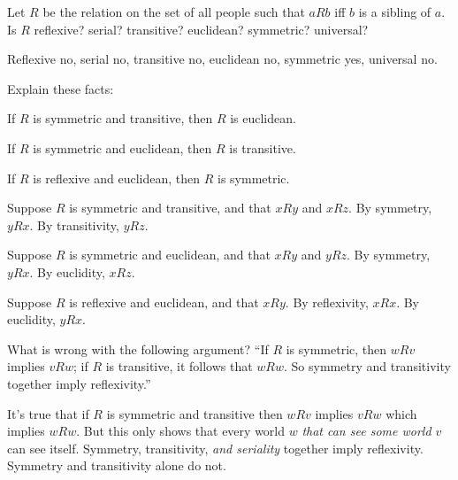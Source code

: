 \begin{exercise}
  Let $R$ be the relation on the set of all people such that $aRb$ iff $b$ is a
  sibling of $a$. Is $R$ reflexive? serial? transitive? euclidean? symmetric?
  universal?
\end{exercise}
\begin{solution}
  Reflexive no, serial no, transitive no, euclidean no, symmetric yes,
  universal no.
\end{solution}

\begin{exercise}\label{ex:relations}
  Explain these facts:
  \begin{exlist}
  \item If $R$ is symmetric and transitive, then $R$ is euclidean.
  \item If $R$ is symmetric and euclidean, then $R$ is transitive.
  \item If $R$ is reflexive and euclidean, then $R$ is symmetric.
  \end{exlist}
\end{exercise}
\begin{solution}
  \begin{sollist}
    \item Suppose $R$ is symmetric and transitive, and that $xRy$ and $xRz$. By
    symmetry, $yRx$. By transitivity, $yRz$.
    \item Suppose $R$ is symmetric and euclidean, and that $xRy$ and $yRz$. By
    symmetry, $yRx$. By euclidity, $xRz$.
    \item Suppose $R$ is reflexive and euclidean, and that $xRy$. By
    reflexivity, $xRx$. By euclidity, $yRx$.
  \end{sollist}
\end{solution}

\begin{exercise}
  What is wrong with the following argument? ``If $R$ is symmetric,
  then $wRv$ implies $vRw$; if $R$ is transitive, it follows that
  $wRw$. So symmetry and transitivity together imply reflexivity.''
\end{exercise}
\begin{solution}
  It's true that if $R$ is symmetric and transitive then $wRv$ implies $vRw$
  which implies $wRw$. But this only shows that every world $w$ \emph{that can
    see some world $v$} can see itself. Symmetry, transitivity, \emph{and
    seriality} together imply reflexivity. Symmetry and transitivity alone do
  not.
\end{solution}

